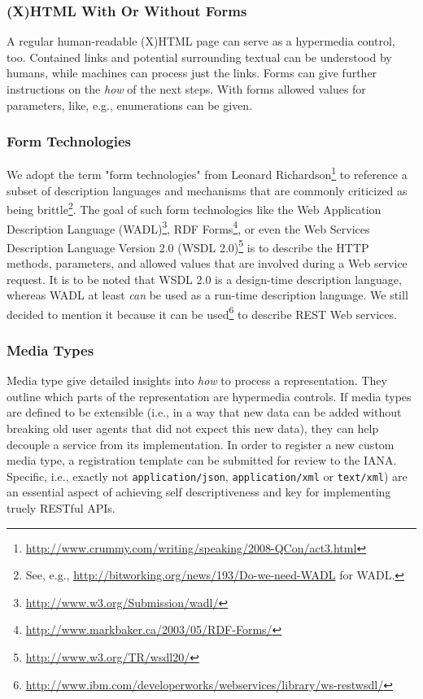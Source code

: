 \documentclass{acm_proc_article-sp}
\begin{document}
\subsubsection{(X)HTML With Or Without Forms}\label{sec:xhtml}
A regular human-readable (X)HTML page can serve as a hypermedia control, too. Contained links and potential surrounding textual can be understood by humans, while machines can process just the links. Forms can give further instructions on the \textit{how} of the next steps. With forms allowed values for parameters, like, e.g., enumerations can be given.

\subsubsection{Form Technologies}\label{sec:formtechs}
We adopt the term "form technologies" from Leonard Richardson\footnote{\url{http://www.crummy.com/writing/speaking/2008-QCon/act3.html}} to reference a subset of description languages and mechanisms that are commonly criticized as being brittle\footnote{See, e.g., \url{http://bitworking.org/news/193/Do-we-need-WADL} for WADL.}. The goal of such form technologies like the Web Application Description Language (WADL)\footnote{\url{http://www.w3.org/Submission/wadl/}}, RDF Forms\footnote{\url{http://www.markbaker.ca/2003/05/RDF-Forms/}}, or even the Web Services Description Language Version 2.0 (WSDL 2.0)\footnote{\url{http://www.w3.org/TR/wsdl20/}} is to describe the HTTP methods, parameters, and allowed values that are involved during a Web service request. It is to be noted that WSDL 2.0 is a design-time description language, whereas WADL at least \textit{can} be used as a run-time description language. We still decided to mention it because it can be used\footnote{\url{http://www.ibm.com/developerworks/webservices/library/ws-restwsdl/}} to describe REST Web services.

\subsubsection{Media Types}\label{sec:mediatypes}
Media type give detailed insights into \textit{how} to process a representation. They outline which parts of the representation are hypermedia controls. If media types are defined to be extensible (i.e., in a way that new data can be added without breaking old user agents that did not expect this new data), they can help decouple a service from its implementation. In order to register a new custom media type, a registration template can be submitted for review to the IANA\cite{IANA:Mime}. Specific, i.e., exactly not \texttt{application/json}, \texttt{application/xml} or \texttt{text/xml}) are an essential aspect of achieving self descriptiveness and key for implementing truely RESTful APIs.
\end{document}
